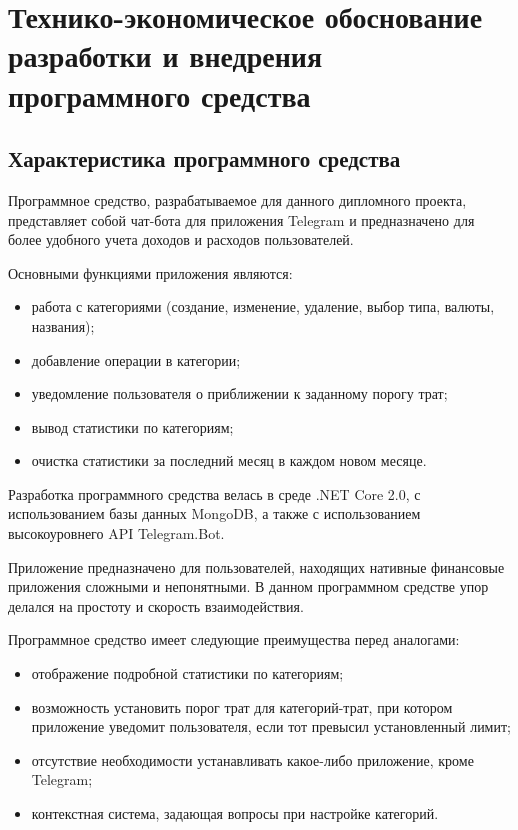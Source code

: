 


\section{Технико-экономическое обоснование разработки и внедрения программного средства}
\label{sec:economics}

\subsection{Характеристика программного средства}
\label{sec:economics:description}

Программное средство, разрабатываемое для данного дипломного проекта, представляет собой чат-бота для приложения Telegram и предназначено для более удобного учета доходов и расходов пользователей.

Основными функциями приложения являются:

\begin{itemize}
	\item работа с категориями (создание, изменение, удаление, выбор типа, валюты, названия);
	\item добавление операции в категории;
	\item уведомление пользователя о приближении к заданному порогу трат;
	\item вывод статистики по категориям;
	\item очистка статистики за последний месяц в каждом новом месяце.
\end{itemize}

Разработка программного средства велась в среде .NET Core 2.0, с использованием базы данных MongoDB, а также с использованием высокоуровнего API Telegram.Bot.

Приложение предназначено для пользователей, находящих нативные финансовые приложения сложными и непонятными. В данном программном средстве упор делался на простоту и скорость взаимодействия.

Программное средство имеет следующие преимущества перед аналогами:

\begin{itemize}
	\item отображение подробной статистики по категориям;
	\item возможность установить порог трат для категорий-трат, при котором приложение уведомит пользователя, если тот превысил установленный лимит;
	\item отсутствие необходимости устанавливать какое-либо приложение, кроме Telegram;
	\item контекстная система, задающая вопросы при настройке категорий.
\end{itemize}

